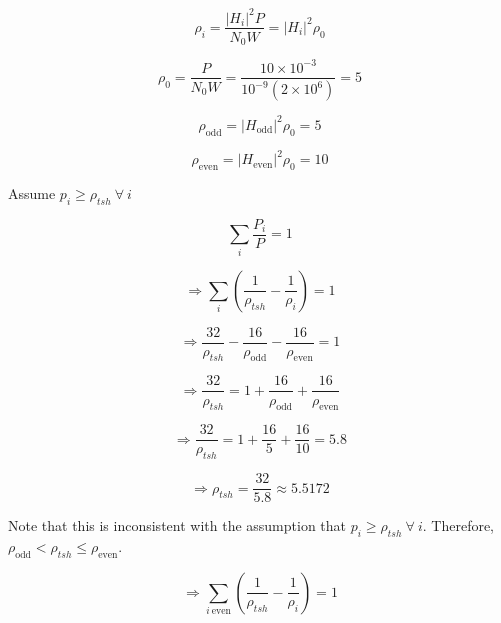 \documentclass[fleqn]{article}
\begin{document}
\begin{enumerate}
		\begin{equation*}
			\rho_i = \frac{|H_i|^2P}{N_0W} = |H_i|^2\rho_0 
		\end{equation*}
		
		\begin{equation*}
			\rho_0 = \frac{P}{N_0W} = \frac{10 \times 10^{-3}}{10^{-9}(2 \times 10^6)} = 5
		\end{equation*}
		
		\begin{equation*}
			\rho_{\text{odd}} = |H_{\text{odd}}|^2\rho_0 = 5
		\end{equation*}
		
		\begin{equation*}
			\rho_{\text{even}} = |H_{\text{even}}|^2\rho_0 = 10
		\end{equation*}
		
		Assume $p_i \geq \rho_{tsh}\ \forall\ i$
		
		\begin{equation*}
			\sum_i{\frac{P_i}{P}} = 1
		\end{equation*}
		
		\begin{equation*}
			\Rightarrow \sum_i{\left(\frac{1}{\rho_{tsh}} - \frac{1}{\rho_i}\right)} = 1
		\end{equation*}
		
		\begin{equation*}
			\Rightarrow \frac{32}{\rho_{tsh}} - \frac{16}{\rho_{\text{odd}}} - \frac{16}{\rho_{\text{even}}} = 1
		\end{equation*}
		
		\begin{equation*}
			\Rightarrow \frac{32}{\rho_{tsh}} = 1 + \frac{16}{\rho_{\text{odd}}} + \frac{16}{\rho_{\text{even}}}
		\end{equation*}
		
		\begin{equation*}
			\Rightarrow \frac{32}{\rho_{tsh}} = 1 + \frac{16}{5} + \frac{16}{10} = 5.8
		\end{equation*}
		
		\begin{equation*}
			\Rightarrow \rho_{tsh} = \frac{32}{5.8} \approx 5.5172
		\end{equation*}
		
		Note that this is inconsistent with the assumption that $p_i \geq \rho_{tsh}\ \forall\ i$. Therefore, $\rho_{\text{odd}} < \rho_{tsh} \leq \rho_{\text{even}}$.
		
		\begin{equation*}
			\Rightarrow \sum_{i\ \text{even}}{\left(\frac{1}{\rho_{tsh}} - \frac{1}{\rho_i}\right)} = 1
		\end{equation*}
		

\end{enumerate}
\end{document}
